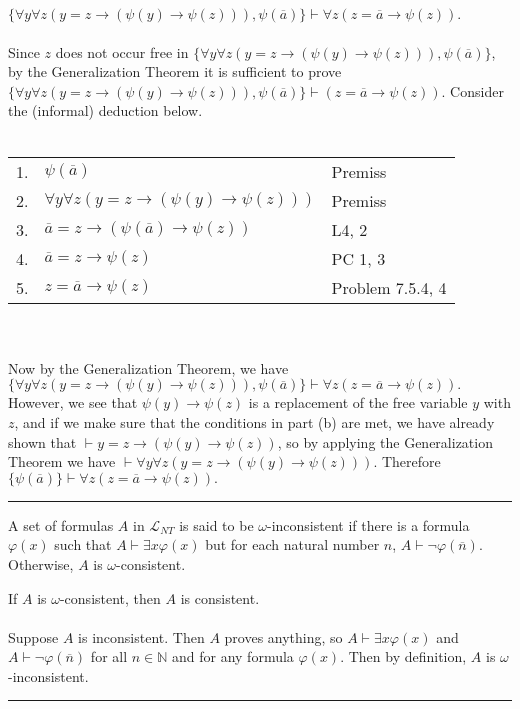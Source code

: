 \documentclass[11pt]{hmcpset}
\newenvironment{problem2}[1]{\noindent {\bf (#1}}
{\medskip}
\newenvironment{problem1}[1]{\noindent {\bf Problem #1}}
{\medskip}
\newenvironment{proof}{\noindent {\bf Proof:} \\}{\hfill
\rule{1mm}{3mm} \bigskip}
\begin{document}
\begin{problem2}{c)} $\{\forall y\forall z(y=z\to(\psi(y)\to\psi(z))), \psi(\overline{a})\}\vdash\forall z(z=\overline{a}\to\psi(z)).$\\
\begin{proof}\indent Since $z$ does not occur free in $\{\forall y\forall z(y=z\to(\psi(y)\to\psi(z))), \psi(\overline{a})\}$, by the Generalization Theorem it is sufficient to prove $\{\forall y\forall z(y=z\to(\psi(y)\to\psi(z))), \psi(\overline{a})\}\vdash(z=\overline{a}\to\psi(z)).$ Consider the (informal) deduction below.\\\\
\begin{tabular}{rll}
1. & $\psi(\overline{a})$ & Premiss\\
2. & $\forall y\forall z(y=z\to(\psi(y)\to\psi(z)))$ & Premiss\\
3. & $\overline{a}=z\to(\psi(\overline{a})\to\psi(z))$   &  L4, 2\\
4. & $\overline{a}=z\to\psi(z)$   &  PC 1, 3\\
5. & $z=\overline{a}\to\psi(z)$ & Problem 7.5.4, 4\end{tabular}\\\\
Now by the Generalization Theorem, we have $\{\forall y\forall z(y=z\to(\psi(y)\to\psi(z))), \psi(\overline{a})\}\vdash\forall z(z=\overline{a}\to\psi(z)).$ However, we see that $\psi(y)\to\psi(z)$ is a replacement of the free variable $y$ with $z$, and if we make sure that the conditions in part (b) are met, we have already shown that $\vdash y=z\to(\psi(y)\to\psi(z))$, so by applying the Generalization Theorem we have $\vdash \forall y\forall z(y=z\to(\psi(y)\to\psi(z)))$. Therefore $\{\psi(\overline{a})\}\vdash\forall z(z=\overline{a}\to\psi(z)).$
\end{proof}
\end{problem2}

\begin{problem1}{4} A set of formulas $A$ in $\mathcal{L}_{NT}$ is said to be $\omega$-inconsistent if there is a formula $\varphi(x)$ such that $A\vdash \exists x\varphi(x)$ but for each natural number $n$, $A\vdash\neg\varphi(\overline{n})$. Otherwise, $A$ is $\omega$-consistent.
\end{problem1}

\begin{problem2}{a)} If $A$ is $\omega$-consistent, then $A$ is consistent.\\
\begin{proof}\indent Suppose $A$ is inconsistent. Then $A$ proves anything, so $A\vdash\exists x\varphi(x)$ and $A\vdash\neg\varphi(\overline{n})$ for all $n\in\mathbb{N}$ and for any formula $\varphi(x)$. Then by definition, $A$ is $\omega$-inconsistent.
\end{proof}
\end{problem2}
\end{document}
